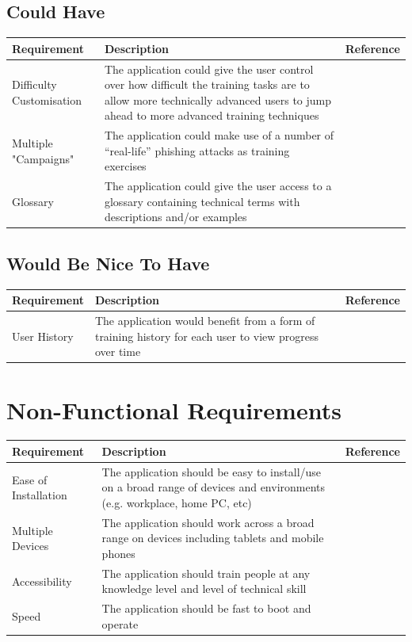 \documentclass{l4proj}
\begin{document}
\subsection{Could Have}
\begin{tabular}{ | m{10em} | m{25em}| m{5em} | } 
  \hline
  \textbf{Requirement} & \textbf{Description} & \textbf{Reference} \\ 
  \hline
  Difficulty Customisation & The application could give the user control over how difficult the training tasks are to allow more technically advanced users to jump ahead to more advanced training techniques &  \\ 
  \hline
  Multiple "Campaigns" & The application could make use of a number of “real-life” phishing attacks as training exercises  &  \\ 
  \hline
  Glossary & The application could give the user access to a glossary containing technical terms with descriptions and/or examples &  \\ 
  \hline
\end{tabular}

\subsection{Would Be Nice To Have}
\begin{tabular}{ | m{10em} | m{25em}| m{5em} | } 
  \hline
  \textbf{Requirement} & \textbf{Description} & \textbf{Reference} \\ 
  \hline
  User History & The application would benefit from a form of training history for each user to view progress over time &  \\ 
  \hline
\end{tabular}

\section{Non-Functional Requirements}
\begin{tabular}{ | m{10em} | m{25em}| m{5em} | } 
  \hline
  \textbf{Requirement} & \textbf{Description} & \textbf{Reference} \\ 
  \hline
  Ease of Installation & The application should be easy to install/use on a broad range of devices and environments (e.g. workplace, home PC, etc) &  \\ 
  \hline
  Multiple Devices & The application should work across a broad range on devices including tablets and mobile phones &  \\ 
  \hline
  Accessibility & The application should train people at any knowledge level and level of technical skill &  \\ 
  \hline
  Speed & The application should be fast to boot and operate &  \\ 
  \hline
\end{tabular} 
\end{document}
